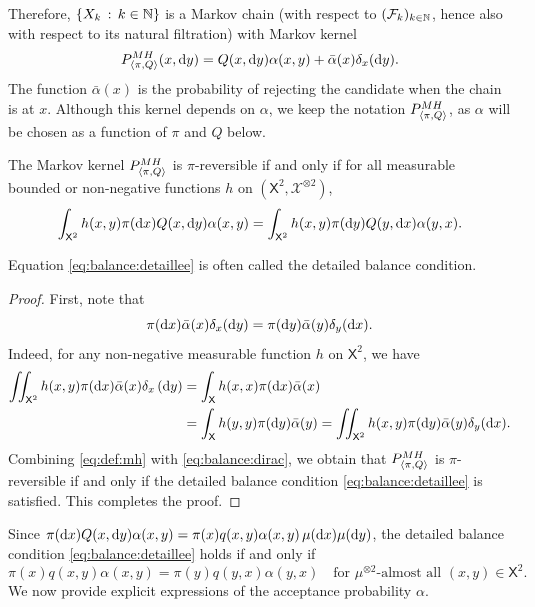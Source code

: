 \documentclass[english,graybox,envcountchap,envcountsame,sectrefs,shortlabels]{svmono}
\theoremstyle{style}
\newcommand{\eqsp}{}
\newcommand{\Xset}{\mathsf{X}}
\newcommand{\Xsigma}{\mathcal{X}}
\begin{document}
Therefore, $\left\{ X_{k}\,:\,k\in\mathbb{N}\right\}$ is a Markov chain (with respect to $(\mathcal{F}_k)_{k\in\mathbb{N}}$, hence also with respect to its natural filtration) with Markov
kernel
\begin{equation}
P_{\langle\pi,Q\rangle}^{MH}(x,\mathrm{d} y)=Q(x,\mathrm{d} y)\alpha(x,y)+\bar{\alpha}(x)\delta_{x}(\mathrm{d} y).\label{eq:def:mh}
\end{equation}
The function $\bar\alpha(x)$ is the probability of rejecting the candidate when the chain is at $x$. Although this kernel depends on $\alpha$, we keep the notation $P_{\langle\pi,Q\rangle}^{MH}$, as $\alpha$ will be chosen as a function of $\pi$ and $Q$ below.

\begin{lemma}
\label{lem:reversible} The Markov kernel $P_{\langle\pi,Q\rangle}^{MH}$ is $\pi$-reversible
if and only if  for all measurable bounded or non-negative functions $h$
on $\left(\Xset^{2},\Xsigma^{\otimes2}\right)$,
\begin{equation}
\int_{\Xset^2} h(x,y)\pi(\rmd x)Q(x,\rmd y)\alpha(x,y)= \int_{\Xset^2} h(x,y)\pi(\rmd y)Q(y,\rmd x)\alpha(y,x).\label{eq:balance:detaillee}
\end{equation}
\end{lemma}
Equation \eqref{eq:balance:detaillee} is often called
the detailed balance condition.
\begin{proof}
First, note that
\begin{equation}
\pi(\mathrm{d} x)\bar{\alpha}(x)\delta_{x}(\mathrm{d} y)=\pi(\mathrm{d} y)\bar{\alpha}(y)\delta_{y}(\mathrm{d} x).\label{eq:balance:dirac}
\end{equation}
Indeed, for any non-negative measurable function $h$ on $\Xset^{2}$, we have
\begin{align*}
\iint_{\Xset^{2}}h(x,y)\pi(\rmd x)\bar{\alpha}(x)\delta_{x}\lr{\rmd y} & =\int_{\Xset}h(x,x)\pi(\rmd x)\bar{\alpha}(x)\\
 & =\int_{\Xset}h(y,y)\pi(\rmd y)\bar{\alpha}(y)=\iint_{\Xset^{2}}h(x,y)\pi(\rmd y)\bar{\alpha}(y)\delta_{y}(\rmd x).
\end{align*}
Combining \eqref{eq:def:mh} with \eqref{eq:balance:dirac}, we obtain that
$P_{\langle\pi,Q\rangle}^{MH}$ is $\pi$-reversible if and only if the detailed balance
condition \eqref{eq:balance:detaillee} is satisfied. This completes
the proof.
\end{proof}

Since $\pi(\mathrm{d} x)Q(x,\mathrm{d} y)\alpha(x,y) = \pi(x)q(x,y)\alpha(x,y)\,\mu(\mathrm{d} x)\mu(\mathrm{d} y)$, the detailed balance condition \eqref{eq:balance:detaillee} holds if and only if
\begin{equation}
\label{eq:balance:density}
\pi(x)q(x,y)\alpha(x,y)=\pi(y)q(y,x)\alpha(y,x)\quad\mbox{for $\mu^{\otimes2}$-almost all $(x,y)\in\Xset^2$}\eqsp.
\end{equation}
We now provide explicit expressions of the acceptance probability $\alpha$.
\end{document}
